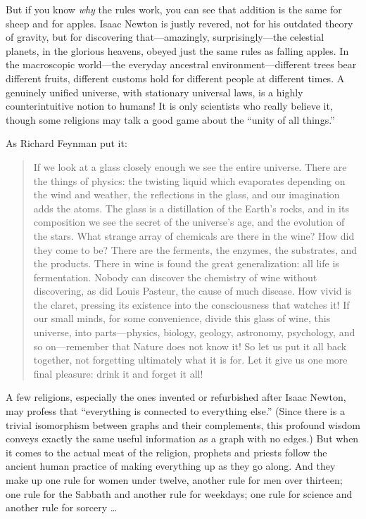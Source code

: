 {
 But if you know \textit{why} the rules work, you can see that
addition is the same for sheep and for apples. Isaac Newton is justly
revered, not for his outdated theory of gravity, but for discovering
that---amazingly, surprisingly---the celestial planets, in the glorious
heavens, obeyed just the same rules as falling apples. In the
macroscopic world---the everyday ancestral environment---different
trees bear different fruits, different customs hold for different
people at different times. A genuinely unified universe, with
stationary universal laws, is a highly counterintuitive notion to
humans! It is only scientists who really believe it, though some
religions may talk a good game about the ``unity of
all things.''}

{
 As Richard Feynman put it:}

\begin{quote}
{
 If we look at a glass closely enough we see the entire universe.
There are the things of physics: the twisting liquid which evaporates
depending on the wind and weather, the reflections in the glass, and
our imagination adds the atoms. The glass is a distillation of the
Earth's rocks, and in its composition we see the secret
of the universe's age, and the evolution of the stars.
What strange array of chemicals are there in the wine? How did they
come to be? There are the ferments, the enzymes, the substrates, and
the products. There in wine is found the great generalization: all life
is fermentation. Nobody can discover the chemistry of wine without
discovering, as did Louis Pasteur, the cause of much disease. How vivid
is the claret, pressing its existence into the consciousness that
watches it! If our small minds, for some convenience, divide this glass
of wine, this universe, into parts---physics, biology, geology,
astronomy, psychology, and so on---remember that Nature does not know
it! So let us put it all back together, not forgetting ultimately what
it is for. Let it give us one more final pleasure: drink it and forget
it all!}
\end{quote}

{
 A few religions, especially the ones invented or refurbished after
Isaac Newton, may profess that ``everything is
connected to everything else.'' (Since there is a
trivial isomorphism between graphs and their complements, this profound
wisdom conveys exactly the same useful information as a graph with no
edges.) But when it comes to the actual meat of the religion, prophets
and priests follow the ancient human practice of making everything up
as they go along. And they make up one rule for women under twelve,
another rule for men over thirteen; one rule for the Sabbath and
another rule for weekdays; one rule for science and another rule for
sorcery \ldots}

